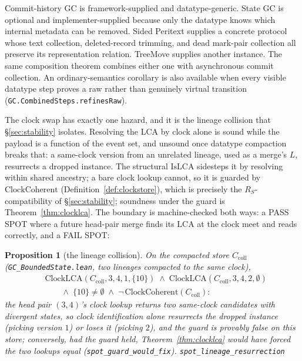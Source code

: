 \documentclass[11pt]{article}
\newtheorem{proposition}[theorem]{Proposition}
\newcommand{\lean}[1]{\texttt{#1}}
\begin{document}
Commit-history GC is framework-supplied and datatype-generic. State GC is
optional and implementer-supplied because only the datatype knows which
internal metadata can be removed. Sided Peritext supplies a concrete protocol
whose text collection, deleted-record trimming, and dead mark-pair collection
all preserve its representation relation. TreeMove supplies another instance.
The same composition theorem combines either one with asynchronous commit
collection. An ordinary-semantics corollary is also available when every
visible datatype step proves a raw rather than genuinely virtual transition
(\lean{GC.CombinedSteps.refinesRaw}).

The clock swap has exactly one hazard, and it is the lineage collision that
\S\ref{sec:stability} isolates. Resolving the LCA by clock alone is sound
while the payload is a function of the event set, and unsound once
datatype compaction breaks that: a same-clock version from an unrelated
lineage, used as a merge's $L$, resurrects a dropped instance. The
structural $\mathrm{IsLCA}$ sidesteps it by resolving within shared
ancestry; a bare clock lookup cannot, so it is guarded by
$\mathrm{ClockCoherent}$ (Definition~\ref{def:clockstore}), which is
precisely the $R_S$-compatibility of \S\ref{sec:stability}; soundness
under the guard is Theorem~\ref{thm:clocklca}. The boundary is
machine-checked both ways: a PASS SPOT where a future head-pair merge
finds its LCA at the clock meet and reads correctly, and a FAIL SPOT:

\begin{proposition}[the lineage collision]
\label{prop:lineage}
On the compacted store $C_{\mathrm{coll}}$
(\lean{GC\_BoundedState.lean}, two lineages compacted to the same
clock),
\[
\begin{aligned}
  &\mathrm{ClockLCA}(C_{\mathrm{coll}}, 3, 4, 1, \{10\})
  \;\wedge\; \mathrm{ClockLCA}(C_{\mathrm{coll}}, 3, 4, 2, \emptyset) \\
  &\qquad\wedge\; \{10\} \neq \emptyset
  \;\wedge\; \neg\, \mathrm{ClockCoherent}(C_{\mathrm{coll}}) :
\end{aligned}
\]
the head pair $(3,4)$'s clock lookup returns two same-clock candidates
with divergent states, so clock identification alone resurrects the
dropped instance (picking version $1$) or loses it (picking $2$), and
the guard is provably false on this store; conversely, had the guard
held, Theorem~\ref{thm:clocklca} would have forced the two lookups
equal (\lean{spot\_guard\_would\_fix}).
\hfill\lean{spot\_lineage\_resurrection}
\end{proposition}
\end{document}
